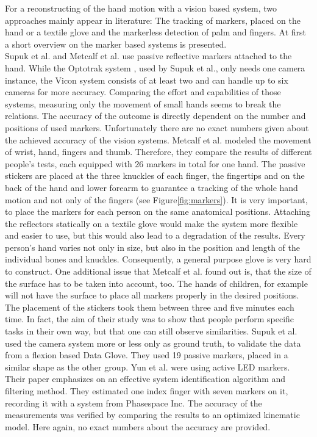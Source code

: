 For a reconstructing of the hand motion with a vision based system, two approaches mainly appear in literature: The tracking of markers, placed on the hand or a textile glove and the markerless detection of palm and fingers. At first a short overview on the marker based systems is presented. \\
Supuk et al. \cite{supuk2008evaluation} and Metcalf et al. \cite{metcalf2008validation} use passive reflective markers attached to the hand. While the Optotrak system \cite{optotrak}, used by Supuk et al., only needs one camera instance, the Vicon system \cite{vicon} consists of at least two and can handle up to six cameras for more accuracy. Comparing the effort and capabilities of those systems, measuring only the movement of small hands seems to break the relations. The accuracy of the outcome is directly dependent on the number and positions of used markers. Unfortunately there are no exact numbers given about the achieved accuracy of the vision systems. Metcalf et al. modeled the movement of wrist, hand, fingers and thumb. Therefore, they compare the results of different people's tests, each equipped with 26 markers in total for one hand. The passive stickers are placed at the three knuckles of each finger, the fingertips and on the back of the hand and lower forearm to guarantee a tracking of the whole hand motion and not only of the fingers (see Figure\ref{fig:markers}). It is very important, to place the markers for each person on the same anatomical positions. Attaching the reflectors statically on a textile glove would make the system more flexible and easier to use, but this would also lead to a degradation of the results. Every person's hand varies not only in size, but also in the position and length of the individual bones and knuckles. Consequently, a general purpose glove is very hard to construct. One additional issue that Metcalf et al. found out is, that the size of the surface has to be taken into account, too. The hands of children, for example will not have the surface to place all markers properly in the desired positions. The placement of the stickers took them between three and five minutes each time. In fact, the aim of their study was to show that people perform specific tasks in their own way, but that one can still observe similarities. Supuk et al. used the camera system more or less only as ground truth, to validate the data from a flexion based Data Glove. They used 19 passive markers, placed in a similar shape as the other group. Yun et al. were using active LED markers. Their paper emphasizes on an effective system identification algorithm and filtering method. They estimated one index finger with seven markers on it, recording it with a system from Phasespace Inc. The accuracy of the measurements was verified by comparing the results to an optimized kinematic model. Here again, no exact numbers about the accuracy are provided.\\
